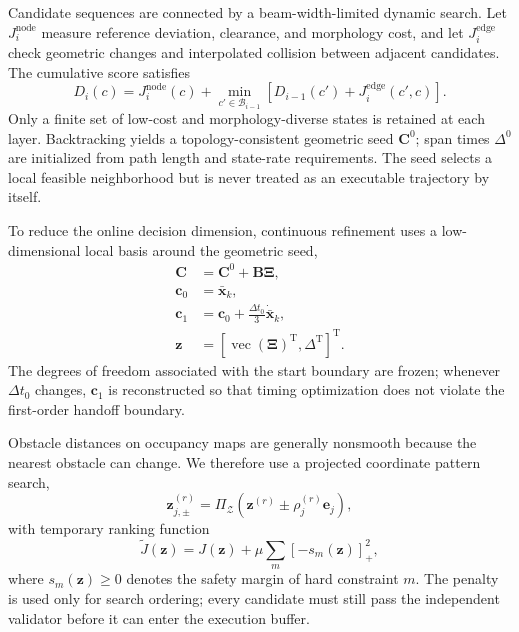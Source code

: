 \documentclass[journal,twoside]{IEEEtran}
\begin{document}
Candidate sequences are connected by a beam-width-limited dynamic search. Let $J_i^{\mathrm{node}}$ measure reference deviation, clearance, and morphology cost, and let $J_i^{\mathrm{edge}}$ check geometric changes and interpolated collision between adjacent candidates. The cumulative score satisfies
\begin{equation}
D_i(c)=J_i^{\mathrm{node}}(c)+
\min_{c'\in\mathcal B_{i-1}}
\left[D_{i-1}(c')+J_i^{\mathrm{edge}}(c',c)\right].
\label{eq:beam_search}
\end{equation}
Only a finite set of low-cost and morphology-diverse states is retained at each layer. Backtracking yields a topology-consistent geometric seed $\mathbf C^0$; span times $\Delta^0$ are initialized from path length and state-rate requirements. The seed selects a local feasible neighborhood but is never treated as an executable trajectory by itself.

To reduce the online decision dimension, continuous refinement uses a low-dimensional local basis around the geometric seed,
\begin{equation}
\begin{aligned}
\mathbf C&=\mathbf C^0+\mathbf B\boldsymbol\Xi,\\
\mathbf c_0&=\bar{\mathbf x}_k,\\
\mathbf c_1&=\mathbf c_0+\frac{\Delta t_0}{3}\dot{\bar{\mathbf x}}_k,\\
\mathbf z&=[\operatorname{vec}(\boldsymbol\Xi)^{\mathrm T},\Delta^{\mathrm T}]^{\mathrm T}.
\end{aligned}
\label{eq:local_basis}
\end{equation}
The degrees of freedom associated with the start boundary are frozen; whenever $\Delta t_0$ changes, $\mathbf c_1$ is reconstructed so that timing optimization does not violate the first-order handoff boundary.

Obstacle distances on occupancy maps are generally nonsmooth because the nearest obstacle can change. We therefore use a projected coordinate pattern search,
\begin{equation}
\mathbf z_{j,\pm}^{(r)}=
\Pi_{\mathcal Z}\!\left(\mathbf z^{(r)}\pm\rho_j^{(r)}\mathbf e_j\right),
\label{eq:pattern_search}
\end{equation}
with temporary ranking function
\begin{equation}
\tilde J(\mathbf z)=J(\mathbf z)+
\mu\sum_m[-s_m(\mathbf z)]_+^2,
\label{eq:penalty_search}
\end{equation}
where $s_m(\mathbf z)\ge0$ denotes the safety margin of hard constraint $m$. The penalty is used only for search ordering; every candidate must still pass the independent validator before it can enter the execution buffer.
\end{document}
